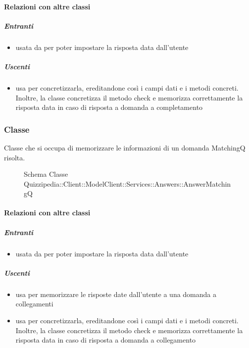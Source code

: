 \paragraph{Relazioni con altre classi}
\subparagraph{Entranti}
\begin{itemize}
\item usata da  per poter impostare la risposta data dall'utente
\end{itemize}
\subparagraph{Uscenti}
\begin{itemize}
\item usa  per concretizzarla, ereditandone così i campi dati e i metodi concreti. Inoltre, la classe concretizza il metodo check e memorizza correttamente la risposta data in caso di risposta a domanda a completamento
\end{itemize}
\subsubsection{Classe }
Classe che si occupa di memorizzare le informazioni di un domanda MatchingQ risolta.
\begin{figure}[H]
\centering
\noindent{}
\caption[Schema Classe AnswerMatchingQ]{Schema Classe Quizzipedia::Client::ModelClient::Services::Answers::AnswerMatchingQ}
\end{figure}
\paragraph{Relazioni con altre classi}
\subparagraph{Entranti}
\begin{itemize}
\item usata da  per poter impostare la risposta data dall'utente
\end{itemize}
\subparagraph{Uscenti}
\begin{itemize}
\item usa  per memorizzare le risposte date dall'utente a una domanda a collegamenti
\item usa  per concretizzarla, ereditandone così i campi dati e i metodi concreti. Inoltre, la classe concretizza il metodo check e memorizza correttamente la risposta data in caso di risposta a domanda a collegamento
\end{itemize}
